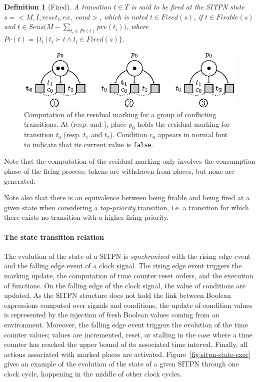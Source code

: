 \documentclass[pdflatex,sn-mathphys]{sn-jnl}%
\theoremstyle{thmstyleone}%
\theoremstyle{thmstyletwo}%
\theoremstyle{thmstylethree}%
\newtheorem{definition}{Definition}%
\begin{document}
\begin{definition}[Fired]
  \label{def:fired}
  A transition $t\in{}T$ is said to be fired at the SITPN state
  $s={<}M,I,reset_t,ex,$ $cond{>}$, which is noted $t\in{}Fired(s)$,
  if $t\in{}Firable(s)$ and
  $t\in{}Sens\big(M-\sum\limits_{t_i\in{}Pr(t)}pre(t_i)\big)$, where
  $Pr(t)=\{t_i~|~t_i\succ{}t\wedge{}t_i\in{}Fired(s)\}$.
\end{definition}


\begin{figure}[H]
  \centering
  \includegraphics[keepaspectratio=true, width=.8\textwidth]{resid-marking.eps}
  \caption[Computation of the residual marking of a group of
  conflicting transitions.]{Computation of the residual marking for a
    group of conflicting transitions. At 
    (resp.  and ), place $p_0$ holds the
    residual marking for transition $t_0$ (resp. $t_1$ and
    $t_2$). Condition $c_0$ appears in normal font to indicate that
    its current value is \texttt{false}.}
  \label{fig:resid-marking}
\end{figure}

Note that the computation of the residual marking only involves the
consumption phase of the firing process; tokens are withdrawn from
places, but none are generated.

Note also that there is an equivalence between being firable and being
fired at a given state when considering a \textit{top-priority}
transition, i.e. a transition for which there exists no transition
with a higher firing priority.

\paragraph{The state transition relation}

The evolution of the state of a SITPN is \textit{synchronized} with
the rising edge event and the falling edge event of a clock signal.
The rising edge event triggers the marking update, the computation of
time counter reset orders, and the execution of functions. On the
falling edge of the clock signal, the value of conditions are
updated. As the SITPN structure does not hold the link between Boolean
expressions computed over \vhdl{} signals and conditions, the update
of condition values is represented by the injection of fresh Boolean
values coming from an environment. Moreover, the falling edge event
triggers the evolution of the time counter values; values are
incremented, reset, or stalling in the case where a time counter has
reached the upper bound of its associated time interval. Finally, all
actions associated with marked places are
activated. Figure~\ref{fig:sitpn-state-exec} gives an example of the
evolution of the state of a given SITPN through one clock cycle,
happening in the middle of other clock cycles.
\end{document}
